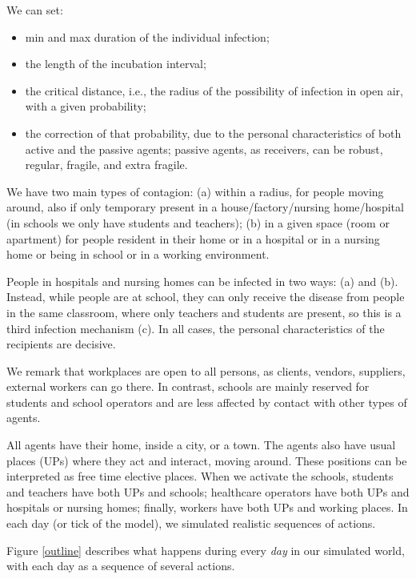 \documentclass[graybox]{svmult}
\begin{document}
We can set: 
\begin{itemize}
\item min and max duration of the individual infection;

\item the length of the incubation interval;

\item the critical distance, i.e., the radius of the possibility of infection in open air, with a given probability;

\item the correction of that probability, due to the personal characteristics of both active and the passive agents; passive agents, as receivers, can be robust, regular, fragile, and extra fragile.

\end{itemize} 

We have two main types of contagion: (a) within a radius, for people moving around, also if only temporary present in a house/factory/nursing home/hospital (in schools we only have students and teachers); (b) in a given space (room or apartment) for people resident in their home or in a hospital or in a nursing home or being in school or in a working environment.

People in hospitals and nursing homes can be infected in two ways: (a) and (b). Instead, while people are at school, they can only receive the disease from people in the same classroom, where only teachers and students are present, so this is a third infection mechanism (c). In all cases, the personal characteristics of the recipients are decisive.

We remark that workplaces are open to all persons, as clients, vendors, suppliers, external workers can go there. In contrast, schools are mainly reserved for students and school operators and are less affected by contact with other types of agents.

All agents have their home, inside a city, or a town. The agents also have usual places (UPs) where they act and interact, moving around. These positions can be interpreted as free time elective places. When we activate the schools, students and teachers have both UPs and schools; healthcare operators have both UPs and hospitals or nursing homes; finally, workers have both UPs and working places. In each day (or tick of the model), we simulated realistic sequences of actions.




Figure \ref{outline} describes what happens during every \emph{day} in our simulated world, with each day as a sequence of several actions.
\end{document}

